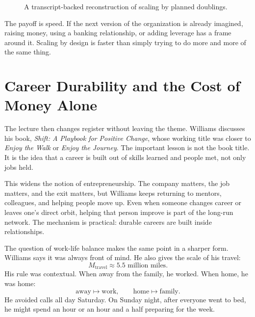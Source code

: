 \begin{figure}
\centering
{}
\caption{A transcript-backed reconstruction of scaling by planned doublings.}
\end{figure}

The payoff is speed. If the next version of the organization is already imagined, raising money, using a banking relationship, or adding leverage has a frame around it. Scaling by design is faster than simply trying to do more and more of the same thing.

\section{Career Durability and the Cost of Money Alone}

The lecture then changes register without leaving the theme. Williams discusses his book, \emph{Shift: A Playbook for Positive Change}, whose working title was closer to \emph{Enjoy the Walk} or \emph{Enjoy the Journey}. The important lesson is not the book title. It is the idea that a career is built out of skills learned and people met, not only jobs held.

This widens the notion of entrepreneurship. The company matters, the job matters, and the exit matters, but Williams keeps returning to mentors, colleagues, and helping people move up. Even when someone changes career or leaves one's direct orbit, helping that person improve is part of the long-run network. The mechanism is practical: durable careers are built inside relationships.

The question of work-life balance makes the same point in a sharper form. Williams says it was always front of mind. He also gives the scale of his travel:
\begin{equation}
M_{\mathrm{travel}} \approx 5.5\text{ million miles}.
\end{equation}
His rule was contextual. When away from the family, he worked. When home, he was home:
\begin{equation}
\text{away} \mapsto \text{work},
\qquad
\text{home} \mapsto \text{family}.
\end{equation}
He avoided calls all day Saturday. On Sunday night, after everyone went to bed, he might spend an hour or an hour and a half preparing for the week.

